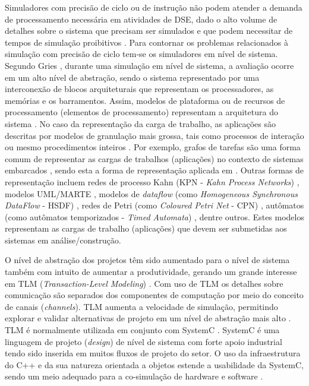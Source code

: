 \documentclass[tese-proposta,nocipinfo]{texufpel}
\begin{document}
Simuladores com precisão de ciclo ou de instrução não podem atender a demanda de processamento necessária em atividades de DSE, dado o alto volume de detalhes sobre o sistema que precisam ser simulados e que podem necessitar de tempos de simulação proibitivos \cite{Herrera201455,gruttner2013complex}. Para contornar os problemas relacionados à simulação com precisão de ciclo tem-se os simuladores em nível de sistema. Segundo Gries \cite{gries2004methods}, durante uma simulação em nível de sistema, a avaliação ocorre em um alto nível de abstração, sendo o sistema representado por uma interconexão de blocos arquiteturais que representam os processadores, as memórias e os barramentos. Assim, modelos de plataforma ou de recursos de processamento (elementos de processamento) representam a arquitetura do sistema \cite{indrusiak2016dynamic}. No caso da  representação da carga de trabalho, as aplicações são descritas por modelos de granulação mais grossa, tais como processos de interação ou mesmo procedimentos inteiros \cite{gries2004methods}. Por exemplo, grafos de tarefas são uma forma comum de representar as cargas de trabalhos (aplicações) no contexto de sistemas embarcados \cite{indrusiak2016dynamic}, sendo esta a forma de representação aplicada em \cite{miele2015system}. Outras formas de representação incluem redes de processo Kahn (KPN - \textit{Kahn Process Networks}) \cite{erbas2007framework}, modelos UML/MARTE \cite{gruttner2013complex,Herrera201455,Leite2016}, modelos de \textit{dataflow} (como \textit{Homogeneous Synchronous DataFlow} - HSDF) \cite{Nogueira2016}, redes de Petri (como \textit{Coloured Petri Net} - CPN) \cite{callou2011energy}, autômatos (como autômatos temporizados - \textit{Timed Automata}) \cite{Jiang:2013:DOM:2491411.2494575,Wang201123}, dentre outros. Estes modelos representam as cargas de trabalho (aplicações) que devem ser submetidas aos sistemas em análise/construção. 

O nível de abstração dos projetos têm sido aumentado para o nível de sistema também com intuito de aumentar a produtividade, gerando um grande interesse em TLM (\textit{Transaction-Level Modeling}) \cite{Cai:2003:TLM}. Com uso de TLM os detalhes sobre comunicação são separados dos componentes de computação por meio do conceito de canais (\textit{channels}). TLM aumenta a velocidade de simulação, permitindo explorar e validar alternativas de projeto em um nível de abstração mais alto \cite{Cai:2003:TLM}. TLM é normalmente utilizada em conjunto com SystemC \cite{patel2008ingredients}. SystemC é  uma linguagem de projeto (\textit{design}) de nível de sistema com forte apoio industrial tendo sido inserida em muitos fluxos de projeto do setor. O uso da infraestrutura do C++ e da sua natureza orientada a objetos estende a usabilidade da SystemC, sendo um meio adequado para a co-simulação de hardware e software \cite{patel2008ingredients}.
\end{document}
